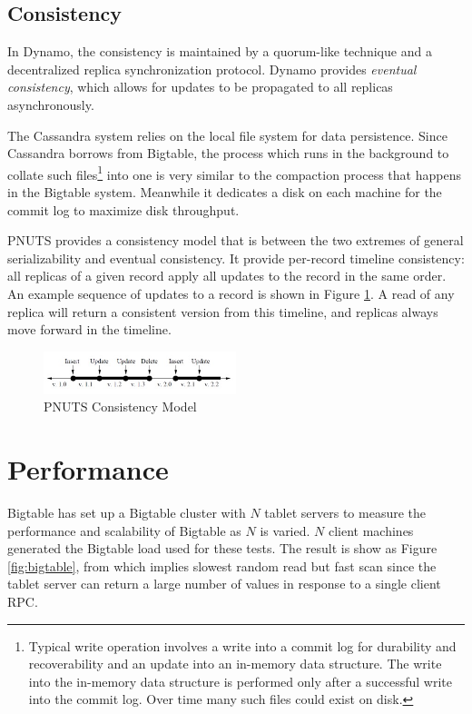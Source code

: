 \documentclass[letter,twocolumn]{article}
\begin{document}
\subsection{Consistency}
In Dynamo, the consistency is maintained by a quorum-like technique and a decentralized replica synchronization protocol.\citep{DeCandia2007} Dynamo provides \textit{eventual consistency}, which allows for updates to be propagated to all replicas asynchronously.

The Cassandra system relies on the local file system for data persistence. Since Cassandra borrows from Bigtable, the process which runs in the background to collate such files\footnote{Typical write operation involves a write into a commit log for durability and recoverability and an update into an in-memory data structure. The write into the in-memory data structure is performed only after a successful write into the commit log. Over time many such files could exist on disk.} into one is very similar to the compaction process that happens in the Bigtable system. Meanwhile it dedicates a disk on each machine for the commit log to maximize disk throughput.\citep{LakshamAvinash2010}

PNUTS provides a consistency model that is between the two extremes of general serializability and eventual consistency. It provide per-record timeline consistency: all replicas of a given record apply all updates to the record in the same order. An example sequence of updates to a record is shown in Figure \ref{fig:pnuts-1}. A read of any replica will return a consistent version from this timeline, and replicas always move forward in the timeline.

\begin{figure}[htbp]
\centering
\includegraphics[width=0.5\textwidth]{fig/pnuts-1}
\caption{PNUTS Consistency Model}
\label{fig:pnuts-1}
\end{figure}

\section{Performance}
Bigtable\citep{Chang2006} has set up a Bigtable cluster with $N$ tablet servers to measure the performance and scalability of Bigtable as $N$ is varied. $N$ client machines generated the Bigtable load used for these tests. The result is show as Figure \ref{fig:bigtable}, from which implies slowest random read but fast scan since the tablet server can return a large number of values in response to a single client RPC.
\end{document}
